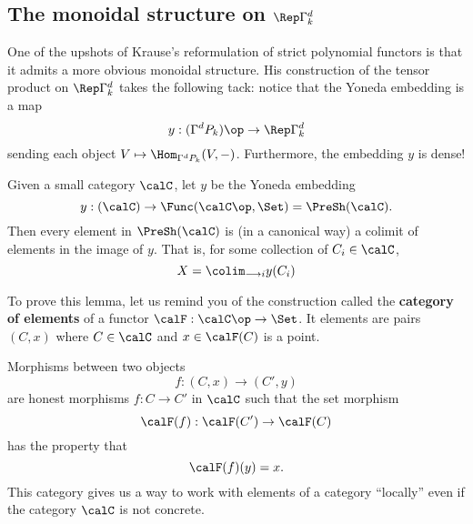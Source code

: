 \documentclass[12pt]{article}
\begin{document}
\subsection{The monoidal structure on \texorpdfstring{$\Rep\Gamma^d_k$}{Rep Gdk}}
One of the upshots of Krause's reformulation of strict polynomial functors is that it admits a more obvious monoidal 
structure. His construction of the tensor product on $\Rep\Gamma_k^d$ takes the following tack: notice that the Yoneda embedding 
is a map 
\[y:(\Gamma^dP_k)\op\to \Rep\Gamma^d_k\]
sending each object $V\mapsto \Hom_{\Gamma^dP_k}(V,-)$. Furthermore, the embedding $y$ is dense!
\begin{lem}\label{lem:yoneda-dense}
	Given a small category $\calC$, let $y$ be the Yoneda embedding 
	\[y:(\calC)\to \Func(\calC\op,\Set)=\PreSh(\calC).\]
	Then every element in $\PreSh(\calC)$ is (in a canonical way) a colimit of elements in the image of $y$. That is, for some collection of $C_i\in \calC$,
	\[X=\colim_{\longrightarrow i}y(C_i)\]
\end{lem}
To prove this lemma, let us remind you of the construction called the \textbf{category of elements} of a functor $\calF:\calC\op\to \Set$. It elements are 
pairs $(C,x)$ where $C\in\calC$ and $x\in \calF(C)$ is a point. 

Morphisms between two objects
\[f:(C,x)\to (C',y)\]
are honest morphisms $f:C\to C'$ in $\calC$ such that the set morphism
\[\calF(f):\calF(C')\to \calF(C)\]
has the property that 
\[\calF(f)(y)=x.\]
This category gives us a way to work with elements of a category ``locally'' even if the category $\calC$ 
is not concrete.
\end{document}
